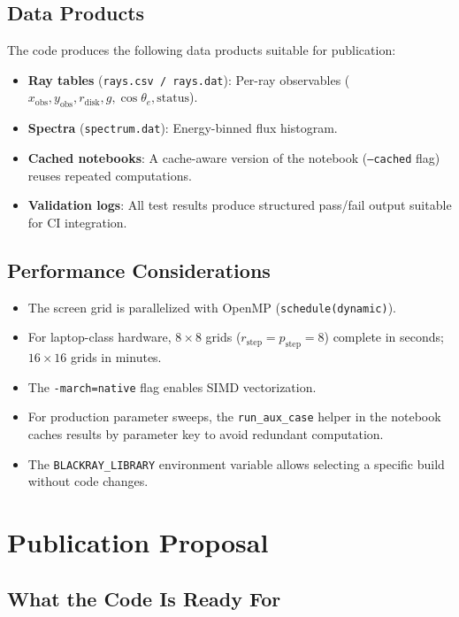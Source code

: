 \documentclass[11pt,twoside]{article}
\begin{document}
\subsection{Data Products}

The code produces the following data products suitable for publication:

\begin{itemize}
\item \textbf{Ray tables} (\texttt{rays.csv / rays.dat}): Per-ray observables
($x_{\text{obs}}, y_{\text{obs}}, r_{\text{disk}}, g, \cos\theta_e, \text{status}$).
\item \textbf{Spectra} (\texttt{spectrum.dat}): Energy-binned flux histogram.
\item \textbf{Cached notebooks}: A cache-aware version of the notebook
(\texttt{--cached} flag) reuses repeated computations.
\item \textbf{Validation logs}: All test results produce structured pass/fail
output suitable for CI integration.
\end{itemize}

\subsection{Performance Considerations}

\begin{itemize}
\item The screen grid is parallelized with OpenMP (\texttt{schedule(dynamic)}).
\item For laptop-class hardware, $8\times8$ grids ($r_{\text{step}}=p_{\text{step}}=8$)
complete in seconds; $16\times16$ grids in minutes.
\item The \texttt{-march=native} flag enables SIMD vectorization.
\item For production parameter sweeps, the \texttt{run\_aux\_case} helper in
the notebook caches results by parameter key to avoid redundant computation.
\item The \texttt{BLACKRAY\_LIBRARY} environment variable allows selecting a
specific build without code changes.
\end{itemize}

\section{Publication Proposal}
\label{sec:proposal}

\subsection{What the Code Is Ready For}
\end{document}
